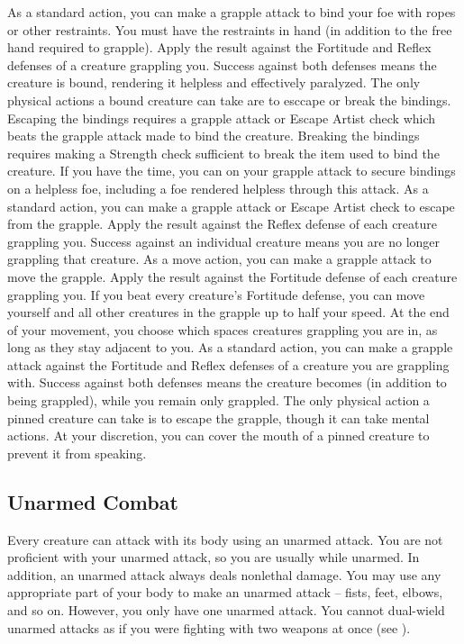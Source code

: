              As a standard action, you can make a grapple attack to bind your foe with ropes or other restraints. You must have the restraints in hand (in addition to the free hand required to grapple). Apply the result against the Fortitude and Reflex defenses of a creature grappling you. Success against both defenses means the creature is bound, rendering it helpless and effectively paralyzed. The only physical actions a bound creature can take are to esccape or break the bindings. Escaping the bindings requires a grapple attack or Escape Artist check which beats the grapple attack made to bind the creature. Breaking the bindings requires making a Strength check sufficient to break the item used to bind the creature. If you have the time, you can  on your grapple attack to secure bindings on a helpless foe, including a foe rendered helpless through this attack.
             As a standard action, you can make a grapple attack or Escape Artist check to escape from the grapple. Apply the result against the Reflex defense of each creature grappling you. Success against an individual creature means you are no longer grappling that creature.
             As a move action, you can make a grapple attack to move the grapple. Apply the result against the Fortitude defense of each creature grappling you. If you beat every creature's Fortitude defense, you can move yourself and all other creatures in the grapple up to half your speed. At the end of your movement, you choose which spaces creatures grappling you are in, as long as they stay adjacent to you.
             As a standard action, you can make a grapple attack against the Fortitude and Reflex defenses of a creature you are grappling with. Success against both defenses means the creature becomes  (in addition to being grappled), while you remain only grappled. The only physical action a pinned creature can take is to escape the grapple, though it can take mental actions. At your discretion, you can cover the mouth of a pinned creature to prevent it from speaking.

    \subsection{Unarmed Combat}\label{Unarmed Combat}
        Every creature can attack with its body using an unarmed attack.
        You are not proficient with your unarmed attack, so you are usually  while unarmed.
        In addition, an unarmed attack always deals nonlethal damage.
        You may use any appropriate part of your body to make an unarmed attack -- fists, feet, elbows, and so on.
        However, you only have one unarmed attack.
        You cannot dual-wield unarmed attacks as if you were fighting with two weapons at once (see ).


